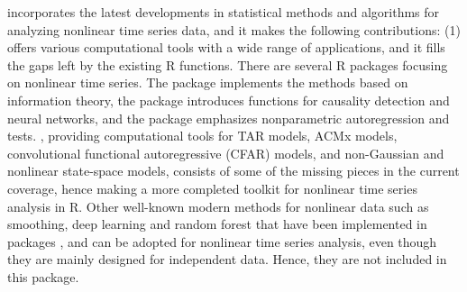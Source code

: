 incorporates
the latest developments in statistical methods and algorithms for analyzing nonlinear time series data, and it makes the following contributions: (1)  offers various computational tools with a wide range of applications, and it fills the gaps left by the existing R functions. There are several R packages focusing on nonlinear time series. The  \citep{RnonlinearTseries} package implements the methods based on information theory, the  \citep{RNlinTS} package introduces functions for causality detection and neural networks, and the  \citep{Rnlts} package emphasizes nonparametric autoregression and tests. , providing computational tools for TAR models, ACMx models, convolutional functional autoregressive (CFAR) models, and non-Gaussian and nonlinear state-space models, consists of some of the missing pieces in the current coverage, hence making a more completed toolkit for nonlinear time series analysis in R. Other well-known modern methods for nonlinear data such as smoothing, deep learning and random forest that have been implemented in packages  \citep{Rsm},  \citep{Rtree} and  \citep{RrandomForest} can be adopted for nonlinear time series analysis, even though they are mainly designed for independent data. Hence, they are not included in this package.
